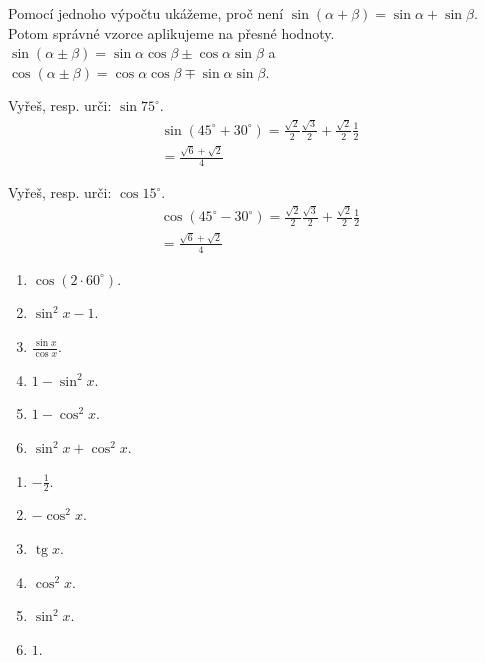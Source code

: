 \documentclass[11pt,a4paper]{article}
\begin{document}
Pomocí jednoho výpočtu ukážeme, proč není $\sin(\alpha+\beta)=\sin\alpha+\sin\beta$. Potom správné vzorce aplikujeme na přesné hodnoty.
$\sin(\alpha\pm\beta)=\sin\alpha\cos\beta\pm\cos\alpha\sin\beta$ a $\cos(\alpha\pm\beta)=\cos\alpha\cos\beta\mp\sin\alpha\sin\beta$.
\begin{prikladReseniBox}[title={Příklad 1}]
Vyřeš, resp. urči: $\sin75^\circ$.
\tcblower
\[\begin{aligned}\sin(45^\circ+30^\circ)=\frac{\sqrt2}{2}\frac{\sqrt3}{2}+\frac{\sqrt2}{2}\frac{1}{2} \\ =\frac{\sqrt6+\sqrt2}{4}\end{aligned}\]
\end{prikladReseniBox}
\begin{prikladReseniBox}[title={Příklad 2}]
Vyřeš, resp. urči: $\cos15^\circ$.
\tcblower
\[\begin{aligned}\cos(45^\circ-30^\circ)=\frac{\sqrt2}{2}\frac{\sqrt3}{2}+\frac{\sqrt2}{2}\frac{1}{2} \\ =\frac{\sqrt6+\sqrt2}{4}\end{aligned}\]
\end{prikladReseniBox}
\begin{zadaniReseniBox}[title={Samostatná práce 1}]
\begin{enumerate}[label=\alph*)]
\item $\cos(2\cdot60^\circ)$.
\item $\sin^2x-1$.
\item $\frac{\sin x}{\cos x}$.
\item $1-\sin^2x$.
\item $1-\cos^2x$.
\item $\sin^2x+\cos^2x$.
\end{enumerate}
\tcblower
\begin{enumerate}[label=\alph*)]
\item $-\frac{1}{2}$.
\item $-\cos^2x$.
\item $\operatorname{tg}x$.
\item $\cos^2x$.
\item $\sin^2x$.
\item $1$.
\end{enumerate}
\end{zadaniReseniBox}
\end{document}
